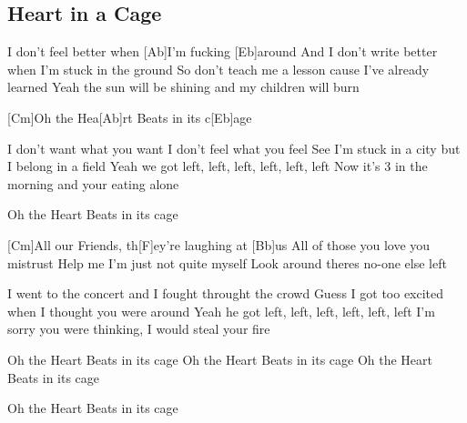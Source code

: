 \subsection*{Heart in a Cage   }
\begin{guitar}
[Cm]I don't feel better when [Ab]I'm fucking [Eb]around
And I don't write better when I'm stuck in the ground
So don't teach me a lesson cause I've already learned
Yeah the sun will be shining and my children will burn



[Cm]Oh the Hea[Ab]rt Beats in its c[Eb]age



I don't want what you want I don't feel what you feel
See I'm stuck in a city but I belong in a field
Yeah we got left, left, left, left, left, left
Now it's 3 in the morning and your eating alone



Oh the Heart Beats in its cage



[Cm]All our Friends, th[F]ey're laughing at [Bb]us\quad[A]{}
All of those you love you mistrust
Help me I'm just not quite myself
Look around theres no-one else left



I went to the concert and I fought throught the crowd
Guess I got too excited when I thought you were around
Yeah he got left, left, left, left, left, left
I'm sorry you were thinking, I would steal your fire



Oh the Heart Beats in its cage
Oh the Heart Beats in its cage
Oh the Heart Beats in its cage






Oh the Heart Beats in its cage
\end{guitar}


